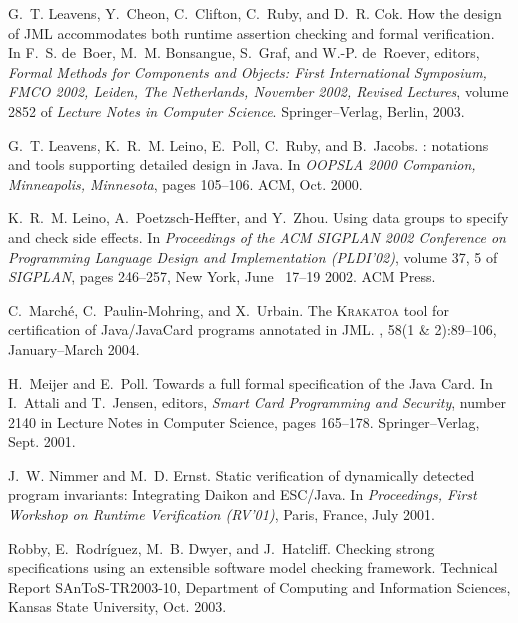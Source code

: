 \documentclass{sig-alternate}
\begin{document}
\begin{thebibliography}{10}
G.~T. Leavens, Y.~Cheon, C.~Clifton, C.~Ruby, and D.~R. Cok.
\newblock How the design of {JML} accommodates both runtime assertion checking
  and formal verification.
\newblock In F.~S. de~Boer, M.~M. Bonsangue, S.~Graf, and W.-P. de~Roever,
  editors, {\em Formal Methods for Components and Objects: First International
  Symposium, FMCO 2002, Leiden, The Netherlands, November 2002, Revised
  Lectures}, volume 2852 of {\em Lecture Notes in Computer Science}.
  Springer--Verlag, Berlin, 2003.

G.~T. Leavens, K.~R.~M. Leino, E.~Poll, C.~Ruby, and B.~Jacobs.
: notations and tools supporting detailed design in {Java}.
\newblock In {\em OOPSLA 2000 Companion, Minneapolis, Minnesota}, pages
  105--106. ACM, Oct. 2000.

K.~R.~M. Leino, A.~Poetzsch-Heffter, and Y.~Zhou.
\newblock Using data groups to specify and check side effects.
\newblock In {\em Proceedings of the {ACM} {SIGPLAN} 2002 Conference on
  Programming Language Design and Implementation ({PLDI}'02)}, volume 37, 5 of
  {\em SIGPLAN}, pages 246--257, New York, June ~17--19 2002. ACM Press.

C.~March{\'e}, C.~Paulin-Mohring, and X.~Urbain.
\newblock The \textsc{Krakatoa} tool for certification of {Java/JavaCard}
  programs annotated in {JML}.
, 58(1 \& 2):89--106,
  January--March 2004.

H.~Meijer and E.~Poll.
\newblock Towards a full formal specification of the {Java Card}.
\newblock In I.~Attali and T.~Jensen, editors, {\em Smart Card Programming and
  Security}, number 2140 in Lecture Notes in Computer Science, pages 165--178.
  Springer--Verlag, Sept. 2001.

J.~W. Nimmer and M.~D. Ernst.
\newblock Static verification of dynamically detected program invariants:
  Integrating {Daikon} and {ESC/Java}.
\newblock In {\em Proceedings, First Workshop on Runtime Verification (RV'01)},
  Paris, France, July 2001.

Robby, E.~Rodr\'{i}guez, M.~B. Dwyer, and J.~Hatcliff.
\newblock Checking strong specifications using an extensible software model
  checking framework.
\newblock Technical Report {SAnToS-TR2003-10}, Department of Computing and Information Sciences,
  Kansas State University, Oct. 2003.

\end{thebibliography}
\end{document}
